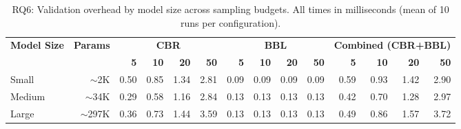 \begin{table}[t]
\centering
\caption{RQ6: Validation overhead by model size across sampling budgets. All times in milliseconds (mean of 10 runs per configuration).}
\vspace{-4mm}
\label{tab:rq6-overhead-full}
\small
\setlength{\tabcolsep}{4pt}
\begin{tabular}{@{}l r rrrr rrrr rrrr@{}}
\toprule
\textbf{Model Size} & \textbf{Params} &
\multicolumn{4}{c}{\textbf{CBR}} &
\multicolumn{4}{c}{\textbf{BBL}} &
\multicolumn{4}{c}{\textbf{Combined (CBR+BBL)}} \\
\cmidrule(lr){3-6}\cmidrule(lr){7-10}\cmidrule(lr){11-14}
& & \textbf{5} & \textbf{10} & \textbf{20} & \textbf{50}
  & \textbf{5} & \textbf{10} & \textbf{20} & \textbf{50}
  & \textbf{5} & \textbf{10} & \textbf{20} & \textbf{50} \\
\midrule
Small   & $\sim$2K   & 0.50 & 0.85 & 1.34 & 2.81 & 0.09 & 0.09 & 0.09 & 0.09 & 0.59 & 0.93 & 1.42 & 2.90 \\
Medium  & $\sim$34K  & 0.29 & 0.58 & 1.16 & 2.84 & 0.13 & 0.13 & 0.13 & 0.13 & 0.42 & 0.70 & 1.28 & 2.97 \\
Large   & $\sim$297K & 0.36 & 0.73 & 1.44 & 3.59 & 0.13 & 0.13 & 0.13 & 0.13 & 0.49 & 0.86 & 1.57 & 3.72 \\
\bottomrule
\end{tabular}
\end{table}
